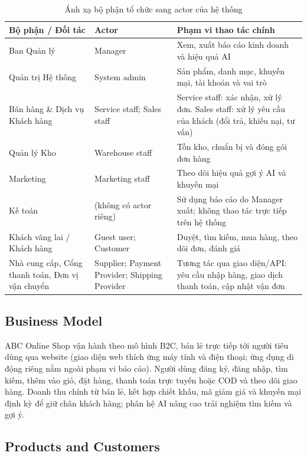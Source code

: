 \documentclass[12pt,a4paper,oneside]{report}
\begin{document}
\begin{longtable}{p{5.2cm}p{4.2cm}p{6.4cm}}
\caption{Ánh xạ bộ phận tổ chức sang actor của hệ thống}\\
\toprule
\textbf{Bộ phận / Đối tác} & \textbf{Actor} & \textbf{Phạm vi thao tác chính} \\
\midrule
\endhead
\bottomrule
\endlastfoot
Ban Quản lý & Manager & Xem, xuất báo cáo kinh doanh và hiệu quả AI \\
Quản trị Hệ thống & System admin & Sản phẩm, danh mục, khuyến mại, tài khoản và vai trò \\
Bán hàng \& Dịch vụ Khách hàng & Service staff; Sales staff & Service staff: xác nhận, xử lý đơn. Sales staff: xử lý yêu cầu của khách (đổi trả, khiếu nại, tư vấn) \\
Quản lý Kho & Warehouse staff & Tồn kho, chuẩn bị và đóng gói đơn hàng \\
Marketing & Marketing staff & Theo dõi hiệu quả gợi ý AI và khuyến mại \\
Kế toán & (không có actor riêng) & Sử dụng báo cáo do Manager xuất; không thao tác trực tiếp trên hệ thống \\
Khách vãng lai / Khách hàng & Guest user; Customer & Duyệt, tìm kiếm, mua hàng, theo dõi đơn, đánh giá \\
Nhà cung cấp, Cổng thanh toán, Đơn vị vận chuyển & Supplier; Payment Provider; Shipping Provider & Tương tác qua giao diện/API: yêu cầu nhập hàng, giao dịch thanh toán, cập nhật vận đơn \\
\end{longtable}

\subsection{Business Model}

ABC Online Shop vận hành theo mô hình B2C, bán lẻ trực tiếp tới người tiêu dùng qua website (giao diện web thích ứng máy tính và điện thoại; ứng dụng di động riêng nằm ngoài phạm vi báo cáo). Người dùng đăng ký, đăng nhập, tìm kiếm, thêm vào giỏ, đặt hàng, thanh toán trực tuyến hoặc COD và theo dõi giao hàng. Doanh thu chính từ bán lẻ, kết hợp chiết khấu, mã giảm giá và khuyến mại định kỳ để giữ chân khách hàng; phân hệ AI nâng cao trải nghiệm tìm kiếm và gợi ý.

\subsection{Products and Customers}
\end{document}
